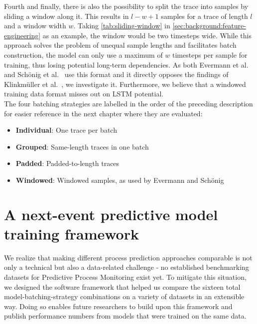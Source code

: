 Fourth and finally, there is also the possibility to split the trace into samples by sliding a window along it. This results in $l-w+1$ samples for a trace of length $l$ and a window width $w$. Taking \autoref{tab:sliding-window} in \autoref{sec:background:feature-engineering} as an example, the window would be two timesteps wide. While this approach solves the problem of unequal sample lengths and facilitates batch construction, the model can only use a maximum of $w$ timesteps per sample for training, thus losing potential long-term dependencies. As both Evermann et al.~\cite{evermann2016} and Schönig et al.~\cite{schoenig2018} use this format and it directly opposes the findings of Klinkmüller et al.~\cite{klinkmuller2018reliablemonitoring}, we investigate it. Furthermore, we believe that a windowed training data format misses out on LSTM potential.\\

The four batching strategies are labelled in the order of the preceding description for easier reference in the next chapter where they are evaluated:
\begin{itemize}
    \item\textbf{Individual}: One trace per batch
    \item\textbf{Grouped}: Same-length traces in one batch
    \item\textbf{Padded}: Padded-to-length traces
    \item\textbf{Windowed}: Windowed samples, as used by Evermann and Schönig
\end{itemize}

\section{A next-event predictive model training framework}
\label{sec:contrib:training-framework}
We realize that making different process prediction approaches comparable is not only a technical but also a data-related challenge - no established benchmarking datasets for Predictive Process Monitoring exist yet.
To mitigate this situation, we designed the software framework that helped us compare the sixteen total model-batching-strategy combinations on a variety of datasets in an extensible way. Doing so enables future researchers to build upon this framework and publish performance numbers from models that were trained on the same data.\\

